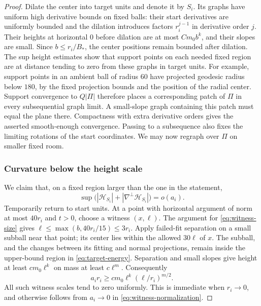 \begin{proof}
Dilate the center into target units and denote it by $S_i$.
Its graphs have uniform high derivative bounds on fixed balls: their
start derivatives are uniformly bounded and the dilation introduces
factors $r_i^{j-1}$ in derivative order $j$. Their heights at
horizontal $0$ before dilation are at most $Cm_0b^k$, and their slopes
are small. Since $b\le r_i/B_*$, the center positions remain bounded
after dilation. The sup height estimates show that support points on
each needed fixed region are at distance tending to zero from these
graphs in target units. For example, support points in an ambient
ball of radius $60$ have projected geodesic radius below $180$,
by the fixed projection bounds and the position of the radial center.
Support convergence to $Q|\Pi|$ therefore places a corresponding
patch of $\Pi$ in every subsequential graph limit. A small-slope graph
containing this patch must equal the plane there. Compactness with
extra derivative orders gives the asserted smooth-enough convergence.
Passing to a subsequence also fixes the limiting rotations of the start
coordinates. We may now regraph over $\Pi$ on smaller fixed room.

\subsubsection*{Curvature below the height scale}
We claim that, on a fixed region larger than the one in the statement,
\begin{equation}\label{eq:center-curvature}
 \sup\bigl(|\mathcal H_{S_i}|+
                 |\nabla^\perp\mathcal H_{S_i}|\bigr)=o(a_i).
\end{equation}
Temporarily return to start units. At a point with horizontal argument
of norm at most $40r_i$ and $t>0$, choose a witness $(x,\ell)$.
The argument for \eqref{eq:witness-size} gives
$\ell\le\max(b,40r_i/15)\le3r_i$.
Apply failed-fit separation on a small subball near that point; its
center lies within the allowed $30\ell$ of $x$. The subball, and
the changes between its fitting and normal projections, remain inside
the upper-bound region in \eqref{eq:target-energy}. Separation and
small slopes give height at least $cm_0\ell^k$ on mass at least
$c\ell^m$. Consequently
\begin{equation}\label{eq:witness-normalization}
 a_i r_i\ge cm_0\ell^k(\ell/r_i)^{m/2}.
\end{equation}
All such witness scales tend to zero uniformly. This is immediate
when $r_i\to0$, and otherwise follows from $a_i\to0$ in
\eqref{eq:witness-normalization}.


\end{proof}
